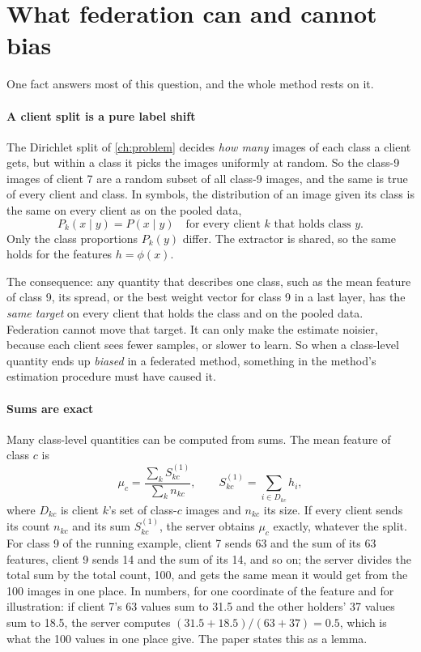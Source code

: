 \section{What federation can and cannot bias}\label{ch:sums}

One fact answers most of this question, and the whole method rests on it.

\paragraph{A client split is a pure label shift} The Dirichlet split of \cref{ch:problem} decides \emph{how many}
images of each class a client gets, but within a class it picks the images uniformly at random. So the class-9 images
of client 7 are a random subset of all class-9 images, and the same is true of every client and class. In symbols, the
distribution of an image given its class is the same on every client as on the pooled data,
\[
P_k(x\mid y)=P(x\mid y)\quad\text{for every client $k$ that holds class $y$.}
\]
Only the class proportions $P_k(y)$ differ. The extractor is shared, so the same holds for the features $h=\phi(x)$.

The consequence: any quantity that describes one class, such as the mean feature of class 9, its spread, or the best
weight vector for class 9 in a last layer, has the \emph{same target} on every client that holds the class and on the
pooled data. Federation cannot move that target. It can only make the estimate noisier, because each client sees fewer
samples, or slower to learn. So when a class-level quantity ends up \emph{biased} in a federated method, something in
the method's estimation procedure must have caused it.

\paragraph{Sums are exact} Many class-level quantities can be computed from sums. The mean feature of class $c$ is
\[
\mu_c=\frac{\sum_k S^{(1)}_{kc}}{\sum_k n_{kc}},\qquad S^{(1)}_{kc}=\sum_{i\in D_{kc}}h_i,
\]
where $D_{kc}$ is client $k$'s set of class-$c$ images and $n_{kc}$ its size. If every client sends its count $n_{kc}$
and its sum $S^{(1)}_{kc}$, the server obtains $\mu_c$ exactly, whatever the split. For class 9 of the running
example, client 7 sends 63 and the sum of its 63 features, client 9 sends 14 and the sum of its 14, and so on; the
server divides the total sum by the total count, 100, and gets the same mean it would get from the 100 images in one
place. In numbers, for one coordinate of the feature and for illustration: if client 7's 63 values sum to 31.5 and
the other holders' 37 values sum to 18.5, the server computes $(31.5+18.5)/(63+37)=0.5$, which is what the 100 values in
one place give. The paper states this as a lemma.

